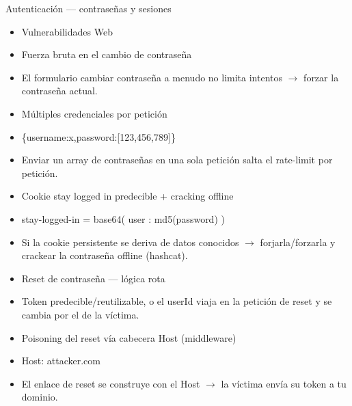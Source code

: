\documentclass[aspectratio=169,10pt]{beamer}
\begin{document}
\begin{frame}[allowframebreaks]{Autenticación --- contraseñas y sesiones}
\small
  \begin{itemize}
  \item Vulnerabilidades Web
  \item Fuerza bruta en el cambio de contraseña
  \item El formulario cambiar contraseña a menudo no limita intentos $\rightarrow$ forzar la contraseña actual.
  \item Múltiples credenciales por petición
  \item \{\textquotedbl{}username\textquotedbl{}:\textquotedbl{}x\textquotedbl{},\textquotedbl{}password\textquotedbl{}:[\textquotedbl{}123\textquotedbl{},\textquotedbl{}456\textquotedbl{},\textquotedbl{}789\textquotedbl{}]\}
  \item Enviar un array de contraseñas en una sola petición salta el rate-limit por petición.
  \item Cookie stay logged in predecible + cracking offline
  \item stay-logged-in = base64( user : md5(password) )
  \item Si la cookie persistente se deriva de datos conocidos $\rightarrow$ forjarla/forzarla y crackear la contraseña offline (hashcat).
  \item Reset de contraseña --- lógica rota
  \item Token predecible/reutilizable, o el userId viaja en la petición de reset y se cambia por el de la víctima.
  \item Poisoning del reset vía cabecera Host (middleware)
  \item Host: attacker.com
  \item El enlace de reset se construye con el Host $\rightarrow$ la víctima envía su token a tu dominio.
  \end{itemize}
\end{frame}
\end{document}
